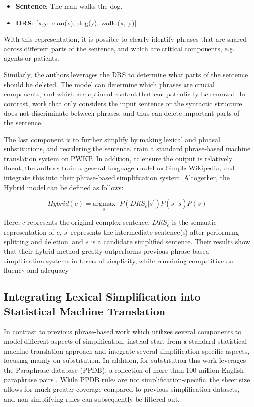 \documentclass[thesis.tex]{subfiles}
\begin{document}
\begin{itemize}
    \item \textbf{Sentence}: The man walks the dog.
    \item \textbf{DRS}: [x,y: man(x), dog(y), walks(x, y)]
\end{itemize}

With this representation, it is possible to clearly identify phrases that are shared across different parts of the sentence, and which are critical components, e.g. agents or patients.

Similarly, the authors leverages the DRS to determine what parts of the sentence should be deleted. The model can determine which phrases are crucial components, and which are optional content that can potentially be removed. In contrast, work that only considers the input sentence or the syntactic structure does not discriminate between phrases, and thus can delete important parts of the sentence.

The last component is to further simplify by making lexical and phrasal substitutions, and reordering the sentence. \cite{narayan2014hybrid} train a standard phrase-based machine translation system on PWKP. In addition, to ensure the output is relatively fluent, the authors train a general language model on Simple Wikipedia, and integrate this into their phrase-based simplification system. Altogether, the Hybrid model can be defined as follows:

\begin{equation}
    Hybrid(c) = \underset{s}{\text{argmax}}\text{ }P(DRS_c | s^{\prime}) P(s^{\prime}|s) P(s)
\end{equation}

Here, $c$ represents the original complex sentence, $DRS_c$ is the semantic representation of $c$, $s^{\prime}$ represents the intermediate sentence(s) after performing splitting and deletion, and $s$ is a candidate simplified sentence. Their results show that their hybrid method greatly outperforms previous phrase-based simplification systems in terms of simplicity, while remaining competitive on fluency and adequacy.

\subsection{Integrating Lexical Simplification into Statistical Machine Translation}

In contrast to previous phrase-based work which utilizes several components to model different aspects of simplification, \cite{xu2016optimizing} instead start from a standard statistical machine translation approach and integrate several simplification-specific aspects, focusing mainly on substitution. In addition, for substitution this work leverages the Paraphrase database (PPDB), a collection of more than 100 million English paraphrase pairs \citep{ganitkevitch2013ppdb}. While PPDB rules are not simplification-specific, the sheer size allows for much greater coverage compared to previous simplification datasets, and non-simplifying rules can subsequently be filtered out.
\end{document}

